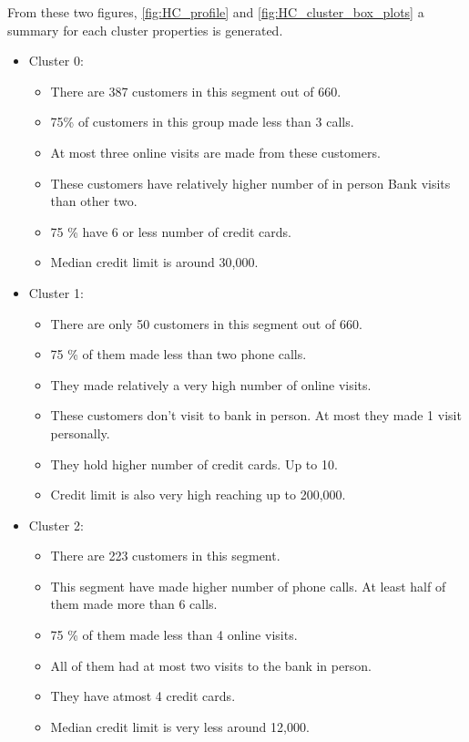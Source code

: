 \documentclass[10pt,a4paper]{style}
\begin{document}
		From these two figures, \ref{fig:HC_profile} and \ref{fig:HC_cluster_box_plots} a summary for each cluster properties is generated.
		\begin{itemize}
			\item Cluster 0:
			\begin{itemize}
				\item There are 387 customers in this segment out of 660.
				\item 75\% of customers in this group made less than 3 calls.
				\item At most three online visits are made from these customers.
				\item These customers have relatively higher number of in person Bank visits than other two.
				\item 75 \% have 6 or less number of credit cards.
				\item Median credit limit is around 30,000. 
			\end{itemize}
			\item Cluster 1:
			\begin{itemize}
				\item There are only 50 customers in this segment out of 660.
				\item 75 \% of them made less than two phone calls.
				\item They made relatively a very high number of online visits.
				\item These customers don't visit to bank in person. At most they made 1 visit personally.
				\item They hold higher number of credit cards. Up to 10.
				\item Credit limit is also very high reaching up to 200,000.   
			\end{itemize}
			\item Cluster 2:
			\begin{itemize}
				\item There are 223 customers in this segment.
				\item This segment have made higher number of phone calls. At least half of them made more than 6 calls.
				\item 75 \% of them made less than 4 online visits.
				\item All of them had at most two visits to the bank in person.
				\item They have atmost 4 credit cards.
				\item Median credit limit is very less around 12,000.
			\end{itemize}
			
		\end{itemize}
		
\end{document}
